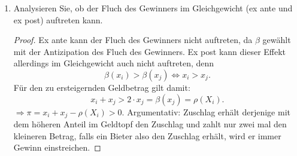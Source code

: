 \documentclass[12pt]{extreport} %
\theoremstyle{named}
\theoremstyle{nnamed}
\theoremstyle{itshape}
\theoremstyle{normal}
\begin{document}
\begin{enumerate}
\begin{proof}
		\end{proof}
	\item Analysieren Sie, ob der Fluch des Gewinners im Gleichgewicht (ex ante und ex post) auftreten kann.
		\begin{proof}
			Ex ante kann der Fluch des Gewinners nicht auftreten, da $\beta$ gewählt mit der Antizipation des Fluch des Gewinners. Ex post kann dieser Effekt allerdings im Gleichgewicht auch nicht auftreten, denn 
				$$ \beta(x_i) > \beta(x_j) \iff x_i > x_j. $$
				Für den zu ersteigernden Geldbetrag gilt damit:
				$$ x_i + x_j > 2 \cdot x_j = \beta(x_j) = \rho(X_i). $$
				$\Rightarrow \pi = x_i + x_j - \rho(X_i) > 0$. Argumentativ: Zuschlag erhält derjenige mit dem höheren Anteil im Geldtopf den Zuschlag und zahlt nur zwei mal den kleineren Betrag, falls ein Bieter also den Zuschlag erhält, wird er immer Gewinn einstreichen.
		\end{proof}
\end{enumerate}
%
%
%
%
%
%
\end{document}

